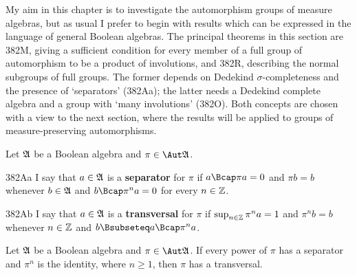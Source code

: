 
\def\chaptername{Automorphisms}
\def\sectionname{Factorization of automorphisms}

\def\cycleii#1#2#3{\cycle{#1\,_{#2}\,#3}}
\def\Orbit{\mathop{\text{Orb}}}


My aim in this chapter is to investigate the automorphism groups of
measure algebras, but as usual I prefer to begin with results which can
be expressed in the language of general Boolean algebras.
The principal theorems in this section are 382M, giving a sufficient
condition
for every member of a full group of automorphism to be a product of
involutions, and 382R, describing the normal subgroups of full groups.
The former depends on Dedekind $\sigma$-completeness and the presence of
`separators' (382Aa);  the latter needs a Dedekind complete algebra and
a group with `many involutions' (382O).   Both
concepts are chosen with a view to the next section, where the results
will be applied to groups of measure-preserving automorphisms.


Let $\frak A$ be a Boolean algebra and $\pi\in\Aut\frak A$.

\spheader 382Aa I say that $a\in\frak A$ is a {\bf separator} for $\pi$
if $a\Bcap\pi a=0$ and $\pi b=b$
whenever $b\in\frak A$ and $b\Bcap\pi^na=0$ for every $n\in\Bbb Z$.

\spheader 382Ab I say that $a\in\frak A$ is a {\bf transversal} for
$\pi$ if $\sup_{n\in\Bbb Z}\pi^na=1$ and $\pi^nb=b$ whenever
$n\in\Bbb Z$ and $b\Bsubseteq a\Bcap\pi^na$.

 Let $\frak A$ be a Boolean algebra and
$\pi\in\Aut\frak A$.   If every power of $\pi$ has a separator and
$\pi^n$ is the identity, where $n\ge 1$, then $\pi$ has a transversal.


